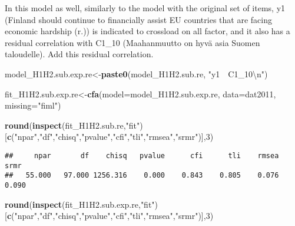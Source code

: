 \documentclass[
]{article}
\newenvironment{Shaded}{\begin{snugshade}}{\end{snugshade}}
\newcommand{\CharTok}[1]{\textcolor[rgb]{0.31,0.60,0.02}{#1}}
\newcommand{\DataTypeTok}[1]{\textcolor[rgb]{0.13,0.29,0.53}{#1}}
\newcommand{\DecValTok}[1]{\textcolor[rgb]{0.00,0.00,0.81}{#1}}
\newcommand{\KeywordTok}[1]{\textcolor[rgb]{0.13,0.29,0.53}{\textbf{#1}}}
\newcommand{\NormalTok}[1]{#1}
\newcommand{\StringTok}[1]{\textcolor[rgb]{0.31,0.60,0.02}{#1}}
\begin{document}
In this model as well, similarly to the model with the original set of
items, y1 (Finland should continue to financially assist EU countries
that are facing economic hardship (r.)) is indicated to crossload on all
factor, and it also has a residual correlation with C1\_10 (Maahanmuutto
on hyvä asia Suomen taloudelle). Add this residual correlation.

\begin{Shaded}
\begin{Highlighting}[]
\NormalTok{model_H1H2.sub.exp.re<-}\KeywordTok{paste0}\NormalTok{(model_H1H2.sub.re,}
                      \StringTok{"y1~~C1_10}\CharTok{\textbackslash{}n}\StringTok{"}\NormalTok{)}
\end{Highlighting}
\end{Shaded}

\begin{Shaded}
\begin{Highlighting}[]
\NormalTok{fit_H1H2.sub.exp.re<-}\KeywordTok{cfa}\NormalTok{(}\DataTypeTok{model=}\NormalTok{model_H1H2.sub.exp.re,}
              \DataTypeTok{data=}\NormalTok{dat2011,}
              \DataTypeTok{missing=}\StringTok{"fiml"}\NormalTok{)}
\end{Highlighting}
\end{Shaded}

\begin{Shaded}
\begin{Highlighting}[]
\KeywordTok{round}\NormalTok{(}\KeywordTok{inspect}\NormalTok{(fit_H1H2.sub.re,}\StringTok{"fit"}\NormalTok{)}
\NormalTok{      [}\KeywordTok{c}\NormalTok{(}\StringTok{"npar"}\NormalTok{,}\StringTok{"df"}\NormalTok{,}\StringTok{"chisq"}\NormalTok{,}\StringTok{"pvalue"}\NormalTok{,}\StringTok{"cfi"}\NormalTok{,}\StringTok{"tli"}\NormalTok{,}\StringTok{"rmsea"}\NormalTok{,}\StringTok{"srmr"}\NormalTok{)],}\DecValTok{3}\NormalTok{)}
\end{Highlighting}
\end{Shaded}

\begin{verbatim}
##     npar       df    chisq   pvalue      cfi      tli    rmsea     srmr 
##   55.000   97.000 1256.316    0.000    0.843    0.805    0.076    0.090
\end{verbatim}

\begin{Shaded}
\begin{Highlighting}[]
\KeywordTok{round}\NormalTok{(}\KeywordTok{inspect}\NormalTok{(fit_H1H2.sub.exp.re,}\StringTok{"fit"}\NormalTok{)}
\NormalTok{      [}\KeywordTok{c}\NormalTok{(}\StringTok{"npar"}\NormalTok{,}\StringTok{"df"}\NormalTok{,}\StringTok{"chisq"}\NormalTok{,}\StringTok{"pvalue"}\NormalTok{,}\StringTok{"cfi"}\NormalTok{,}\StringTok{"tli"}\NormalTok{,}\StringTok{"rmsea"}\NormalTok{,}\StringTok{"srmr"}\NormalTok{)],}\DecValTok{3}\NormalTok{)}
\end{Highlighting}
\end{Shaded}
\end{document}

